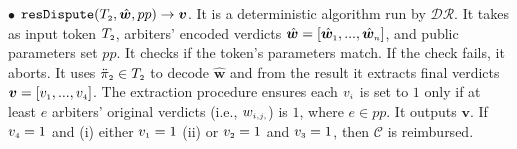 \begin{definition}
\item  [$\bullet$] $\mathtt{resDispute}(T_{\scriptscriptstyle2}, \hat {\bm w}, pp)\rightarrow {\bm v}$. It is a deterministic algorithm run by $\mathcal {DR}$. It takes as input token $T_{\scriptscriptstyle 2}$,   arbiters' encoded verdicts  $\hat{ \bm{w}}=[\hat{\bm{w}}_{\scriptscriptstyle 1},..., \hat{\bm{w}}_{\scriptscriptstyle n}]$, and  public parameters set $pp$. It checks if the token's parameters match. If the check fails, it aborts. It uses $\ddot \pi_{\scriptscriptstyle 2}\in T_{\scriptscriptstyle 2}$  to decode $\hat {\bm w}$ and from the result it extracts final verdicts $\bm v= [v_{\scriptscriptstyle 1},...,v_{\scriptscriptstyle 4}]$.  The extraction procedure ensures each $v_{\scriptscriptstyle i}$ is set to $1$ only if at least  $e$ arbiters' original verdicts (i.e., $w_{\scriptscriptstyle i,j,}$) is $1$, where $e\in pp$.  It outputs $\bm v$. If $v_{\scriptscriptstyle 4}=1$ and (i) either $v_{\scriptscriptstyle 1}=1$ (ii) or $v_{\scriptscriptstyle 2}=1$ and $v_{\scriptscriptstyle 3}=1$, then  $\mathcal C$  is reimbursed.
\end{definition}



%






